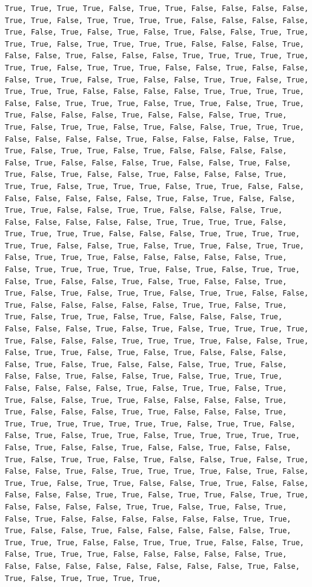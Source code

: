 \documentclass[
  letterpaper,
  DIV=11,
  numbers=noendperiod]{scrartcl}
\begin{document}
\begin{verbatim}
True, True, True, True, False, True, True, False, False, False, False, True, True, False, True, True, True, True, False, False, False, False, True, False, True, False, True, False, True, False, False, True, True, True, True, False, True, True, True, True, False, False, False, True, False, False, True, False, False, False, True, True, True, True, True, True, True, False, True, True, True, False, False, True, False, False, False, True, True, False, True, False, False, True, True, False, True, True, True, True, False, False, False, False, True, True, True, True, False, False, True, True, True, False, True, True, False, True, True, True, False, False, False, True, False, False, False, True, True, True, False, True, True, False, True, False, False, True, True, True, False, False, False, False, True, False, False, False, False, True, True, False, True, True, False, True, False, False, False, False, False, True, False, False, False, True, False, False, True, False, True, False, True, False, False, True, False, False, False, True, True, True, False, True, True, True, False, True, True, False, False, False, False, False, False, False, True, False, True, False, False, True, True, False, False, True, True, False, False, False, True, False, False, False, False, False, True, True, True, True, False, True, True, True, True, False, False, False, True, True, True, True, True, True, False, False, True, False, True, True, False, True, True, False, True, True, True, False, False, False, False, False, True, False, True, True, True, True, True, False, True, False, True, True, False, True, False, False, True, False, True, False, False, True, True, False, True, False, True, True, False, True, True, False, False, True, False, False, False, False, False, True, True, False, True, True, False, True, True, False, True, False, False, False, True, False, False, False, True, False, True, False, True, True, True, True, True, False, False, False, True, True, True, True, False, False, True, False, True, True, False, True, False, True, False, False, False, False, True, False, True, False, False, False, True, True, False, False, False, True, False, False, True, False, True, True, True, False, False, False, False, True, False, True, True, False, True, True, False, False, True, True, False, False, False, False, True, True, False, False, False, True, True, False, False, False, True, True, True, True, True, True, True, True, False, True, True, False, False, True, False, True, True, False, True, True, True, True, True, False, True, False, False, True, False, False, True, False, False, True, False, True, True, False, True, False, False, True, False, True, False, False, True, False, True, True, True, True, False, True, False, True, True, False, True, True, False, False, True, True, False, False, False, False, False, True, True, False, True, True, False, True, True, False, False, False, False, True, True, False, True, False, True, False, True, False, False, False, False, False, False, True, True, True, False, False, True, False, False, False, False, False, True, True, True, True, False, False, True, True, True, False, False, True, False, True, True, True, False, False, False, False, False, True, False, False, False, False, False, False, False, False, True, False, True, False, True, True, True, True, 
\end{verbatim}
\end{document}

